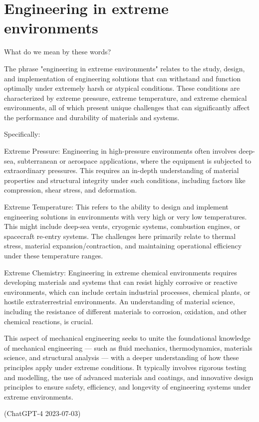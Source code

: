 \section{Engineering in extreme environments}
What do we mean by these words?
\begin{quoting}
    The phrase "engineering in extreme environments" relates to the study, design, and implementation of engineering solutions that can withstand and function optimally under extremely harsh or atypical conditions. These conditions are characterized by extreme pressure, extreme temperature, and extreme chemical environments, all of which present unique challenges that can significantly affect the performance and durability of materials and systems.

    Specifically:

    Extreme Pressure: Engineering in high-pressure environments often involves deep-sea, subterranean or aerospace applications, where the equipment is subjected to extraordinary pressures. This requires an in-depth understanding of material properties and structural integrity under such conditions, including factors like compression, shear stress, and deformation.

    Extreme Temperature: This refers to the ability to design and implement engineering solutions in environments with very high or very low temperatures. This might include deep-sea vents, cryogenic systems, combustion engines, or spacecraft re-entry systems. The challenges here primarily relate to thermal stress, material expansion/contraction, and maintaining operational efficiency under these temperature ranges.

    Extreme Chemistry: Engineering in extreme chemical environments requires developing materials and systems that can resist highly corrosive or reactive environments, which can include certain industrial processes, chemical plants, or hostile extraterrestrial environments. An understanding of material science, including the resistance of different materials to corrosion, oxidation, and other chemical reactions, is crucial.

    This aspect of mechanical engineering seeks to unite the foundational knowledge of mechanical engineering — such as fluid mechanics, thermodynamics, materials science, and structural analysis — with a deeper understanding of how these principles apply under extreme conditions. It typically involves rigorous testing and modelling, the use of advanced materials and coatings, and innovative design principles to ensure safety, efficiency, and longevity of engineering systems under extreme environments.

    (ChatGPT-4 2023-07-03)
\end{quoting}
